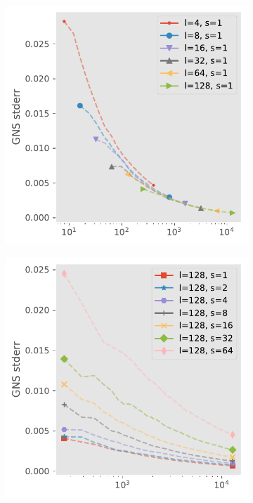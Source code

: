 \documentclass{article}
\begin{document}
\begin{figure}
    \centering
    \begin{subfigure}[b]{0.39\textwidth}
        \centering
        \includegraphics[width=\textwidth]{output_figures/jackknife_Bbig.pdf}
        \label{fig:bigvariance}
    \end{subfigure}
    \begin{subfigure}[b]{0.39\textwidth}
        \centering
        \includegraphics[width=\textwidth]{output_figures/jackknife_Bsmall.pdf}

\end{subfigure}
\end{figure}
\end{document}
